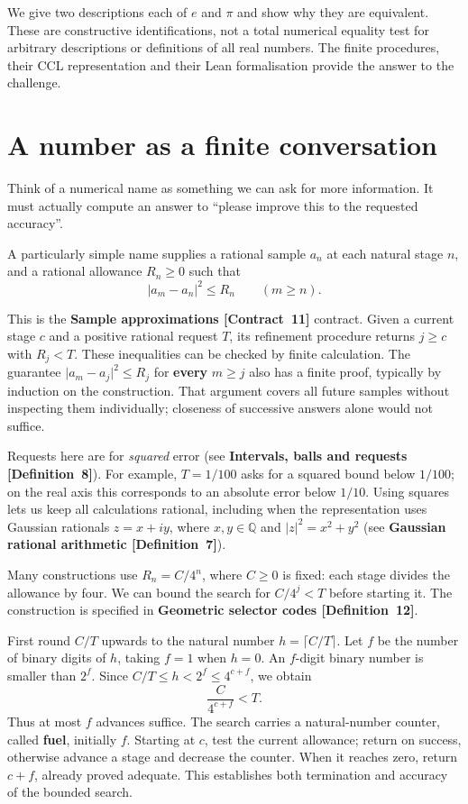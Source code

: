\documentclass[11pt]{article}
\newcommand{\Q}{\mathbb Q}
\newcommand{\sq}[1]{\lvert #1\rvert^2}
\newcommand{\entryname}[3]{\textbf{#3 \mbox{[#1~#2]}}}
\begin{document}
We give two descriptions each of $e$ and $\pi$ and show why they are
equivalent. These are constructive identifications, not a total numerical
equality test for arbitrary descriptions or definitions of all real numbers.
The finite procedures, their CCL representation and their Lean
formalisation provide the answer to the challenge.

\section{A number as a finite conversation}\label{sec:requests}

Think of a numerical name as something we can ask for more information.
It must actually compute an answer to ``please improve this to the requested
accuracy''.

A particularly simple name supplies a rational sample $a_n$ at each
natural stage $n$, and a rational allowance $R_n\geq0$ such that
\[
              \sq{a_m-a_n}\leq R_n\qquad(m\geq n).
\]
\begin{samepage}
This is the \entryname{Contract}{11}{Sample approximations} contract.
Given a current stage $c$ and a positive rational request $T$, its refinement
procedure returns $j\geq c$ with $R_j<T$. These inequalities can be checked
by finite calculation. The guarantee $\sq{a_m-a_j}\leq R_j$ for \textbf{every} $m\geq j$
also has a finite proof, typically by induction on the construction.
That argument covers all future samples without inspecting them individually;
closeness of successive answers alone would not suffice.
\par\end{samepage}

Requests here are for \emph{squared} error
(see \entryname{Definition}{8}{Intervals, balls and requests}).
For example, $T=1/100$ asks for
a squared bound below $1/100$; on the real axis this corresponds to an
absolute error below $1/10$. Using squares lets us keep all calculations
rational, including when the representation uses Gaussian rationals
$z=x+iy$, where $x,y\in\Q$ and $\sq z=x^2+y^2$
(see \entryname{Definition}{7}{Gaussian rational arithmetic}).

Many constructions use $R_n=C/4^n$, where $C\geq0$ is fixed: each stage
divides the allowance by four. We can bound the search for $C/4^j<T$
before starting it. The construction is specified in
\entryname{Definition}{12}{Geometric selector codes}.

First round $C/T$ upwards to the natural number $h=\lceil C/T\rceil$.
Let $f$ be the number of binary digits of $h$, taking $f=1$ when $h=0$.
An $f$-digit binary number is smaller than $2^f$. Since
$C/T\leq h<2^f\leq4^{c+f}$, we obtain
\[
                         \frac{C}{4^{c+f}}<T.
\]
Thus at most $f$ advances suffice. The search carries a natural-number
counter, called \textbf{fuel}, initially $f$. Starting at $c$, test the
current allowance; return on success, otherwise advance a stage and decrease
the counter.
When it reaches zero, return $c+f$, already proved adequate. This establishes
both termination and accuracy of the bounded search.
\end{document}
